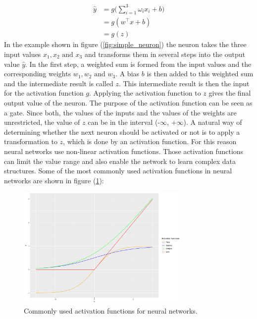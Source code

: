 \begin{equation} \label{eq:simple_neuron}
\begin{split}
	\hat{y}		& = g\bigg( \sum_{i=1}^{3} \omega_i x_i + b \bigg) \\
				& = g(w^\top x + b) \\
				& = g(z)
\end{split}
\end{equation}
In the example shown in figure (\ref{fig:simple_neuron}) the neuron takes the three input values $x_1, x_2 \text{ and } x_3$ and transforms them in several steps into the output value $\hat{y}$. In the first step, a weighted sum is formed from the input values and the corresponding weights $w_1, w_2 \text{ and } w_3$. A bias $b$ is then added to this weighted sum and the intermediate result is called $z$. This intermediate result is then the input for the activation function $g$. Applying the activation function to $z$ gives the final output value of the neuron. The purpose of the activation function can be seen as a gate. Since both, the values of the inputs and the values of the weights are unrestricted, the value of $z$ can be in the interval (-$\infty$, $+\infty$). A natural way of determining whether the next neuron should be activated or not is to apply a transformation to $z$, which is done by an activation function. For this reason neural networks use non-linear activation functions. Those activation functions can limit the value range and also enable the network to learn complex data structures. Some of the most commonly used activation functions in neural networks are shown in figure (\ref{fig:activation_func}): 

\begin{figure}
	\centering
	\includegraphics[width=0.75\textwidth]{figures/chapter_NN/activation_functions}
	\caption{Commonly used activation functions for neural networks.}
	\label{fig:activation_func}
\end{figure}


